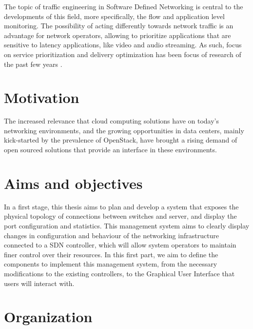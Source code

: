 \par The topic of traffic engineering in Software Defined Networking is central to the developments of this field, more specifically, the flow and application level
monitoring. The possibility of acting differently towards network traffic is an advantage for network operators, allowing to prioritize applications that are
sensitive to latency applications, like video and audio streaming. As such, focus on service prioritization and delivery optimization has been focus of research 
of the past few years \cite{bakhshi_user-centric_2017}.

\section {Motivation}


\par The increased relevance that cloud computing solutions have on today's networking environments, and the growing opportunities in data centers, mainly
kick-started by the prevalence of OpenStack, have brought a rising demand of open sourced solutions that provide an interface in these environments. 

\section {Aims and objectives}


\par In a first stage, this thesis aims to plan and develop a system that exposes the physical topology of connections between switches and server, and display
the port configuration and statistics. This management system aims to clearly display changes in configuration and behaviour of the networking infrastructure
connected to a SDN controller, which will allow system operators to maintain finer control over their resources. In this first part, we aim to define the 
components to implement this management system, from the necessary modifications to the existing controllers, to the Graphical User Interface that users will interact
with. 
\section{Organization}

